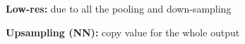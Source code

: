 \textbf{Low-res:} due to all the pooling and down-sampling\\

\textbf{Upsampling (NN):} copy value for the whole output\\ 

